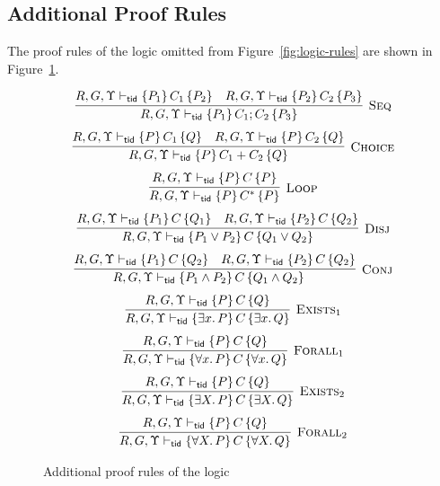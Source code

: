 \subsection{Additional Proof Rules}

The proof rules of the logic omitted from Figure~\ref{fig:logic-rules}
are shown in Figure~\ref{fig:logic2}.
\begin{figure}[t]
$$
\begin{array}{c}
\infer[\textsc{Seq}]{
R, G, \Upsilon \vdash_\ltid \{P_1\}\,C_1; C_2\,\{P_3\}
}{
R, G, \Upsilon \vdash_\ltid \{P_1\}\,C_1\,\{P_2\} 
&
R,G, \Upsilon \vdash_\ltid \{P_2\}\,C_2\,\{P_3\}
}
\\[7pt]
%
\infer[\textsc{Choice}]{
 R, G,\Upsilon \vdash_\ltid \{P\}\,C_1+C_2\,\{Q\}
}{
R, G,\Upsilon \vdash_\ltid \{P\}\,C_1\,\{Q\} 
&
 R, G,\Upsilon \vdash_\ltid \{P\}\,C_2\,\{Q\}
}
\\[7pt]
%
\infer[\textsc{Loop}]{
 R, G,\Upsilon \vdash_\ltid \{P\}\,C^{*}\,\{P\}
}{
 R, G,\Upsilon \vdash_\ltid \{P\}\,C\,\{P\}
}
\\[7pt]
\infer[\textsc{Disj}]{
R, G, \Upsilon \vdash_\ltid \{P_1 \vee P_2\}\,C\,\{Q_1 \vee Q_2\}
}{
R, G, \Upsilon \vdash_\ltid \{P_1\}\,C\,\{Q_1\} 
&
R,G, \Upsilon \vdash_\ltid \{P_2\}\, C\,\{Q_2\}
}
\\[7pt]
\infer[\textsc{Conj}]{
R,G, \Upsilon \vdash_\ltid \{P_1 \land P_2\}\,C\,\{Q_1 \land Q_2\} \quad
}{
R,G, \Upsilon \vdash_\ltid \{P_1\}\,C\,\{Q_2\}
\quad
R,G, \Upsilon \vdash_\ltid \{P_2\}\,C\,\{Q_2\}
}
\\[7pt]
\infer[\textsc{Exists}_1 ]{
R,G, \Upsilon \vdash_\ltid \{\exists x.\, P\}\,C\,\{\exists x.\, Q\}
}{
R,G, \Upsilon \vdash_\ltid \{P\}\,C\,\{Q\}
}
\\[7pt]
\infer[\textsc{Forall}_1 ]{
R,G, \Upsilon \vdash_\ltid \{\forall x.\, P\}\,C\,\{\forall x.\, Q\}
}{
R,G, \Upsilon \vdash_\ltid \{P\}\,C\,\{Q\} 
}
\\[7pt]
\infer[\textsc{Exists}_2 ]{
R,G, \Upsilon \vdash_\ltid \{\exists X.\, P\}\,C\,\{\exists X.\, Q\}
}{
R,G, \Upsilon \vdash_\ltid \{P\}\,C\,\{Q\}
}
\\[7pt]
\infer[\textsc{Forall}_2]{
R,G, \Upsilon \vdash_\ltid \{\forall X.\, P\}\,C\,\{\forall X.\, Q\}
}{
R,G, \Upsilon \vdash_\ltid \{P\}\,C\,\{Q\} 
}
\end{array}
$$
\caption{\small Additional proof rules of the logic}
\label{fig:logic2}
\end{figure}




